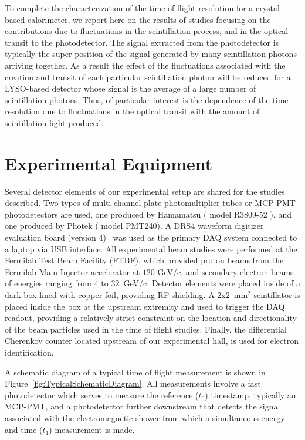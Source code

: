 \documentclass[12pt]{article}
\begin{document}
To complete the characterization of the time of flight resolution
for a crystal based calorimeter, we report here on the results
of studies focusing on the contributions due to fluctuations
in the scintillation process, and in the optical transit
to the photodetector. The signal extracted from the photodetector is 
typically the super-position of the signal generated by many 
scintillation photons arriving together. As a result the effect of 
the fluctuations associated with the creation and transit of 
each particular scintillation photon will be reduced for a LYSO-based 
detector whose signal is the average of a large number of scintillation 
photons. Thus, of particular interest is the dependence of
the time resolution due to fluctuations in the optical transit
with the amount of scintillation light produced.


\section{Experimental Equipment}

Several detector elements of our experimental setup are shared for 
the studies described. Two types of multi-channel plate photomultiplier
tubes or MCP-PMT photodetectors 
are used, one produced by Hamamatsu 
( model R3809-52 ), and one
produced by Photek ( model PMT240). 
A DRS4 waveform digitizer evaluation board (version 4)~\cite{DRS4} was
used as the primary DAQ system connected to a laptop via
USB interface. All experimental beam studies were performed
at the Fermilab Test Beam Facility (FTBF), which 
provided proton beams from the Fermilab Main Injector accelerator
at $120$ GeV/c, and secondary electron beams of energies ranging 
from $4$ to $32$~GeV/c. Detector elements were placed inside of a 
dark box lined with copper foil, providing RF shielding. A
$2$x$2$~$\mathrm{mm}^{2}$ scintillator is placed inside the box at
the upstream extremity and used to trigger the DAQ readout,
providing a relatively strict constraint on the location and directionality
of the beam particles used in the time of flight studies. 
Finally, the differential Cherenkov counter located upstream
of our experimental hall, is used for electron identification. 

A schematic diagram of a typical time of flight measurement
is shown in Figure~\ref{fig:TypicalSchematicDiagram}. All
measurements involve a fast photodetector which serves to
measure the reference ($t_{0}$) timestamp, typically 
an MCP-PMT, and a photodetector further downstream
that detects the signal associated with the
electromagnetic shower from which a simultaneous energy 
and time ($t_{1}$) measurement is made. 
\end{document}
